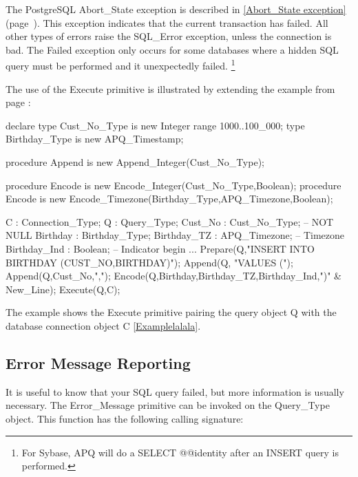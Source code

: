 \documentclass[english,letterpaper]{book}
\newcommand\Ref[1]{\textsection\ref{#1} (page~\pageref{#1})}
\begin{document}
The PostgreSQL Abort\_State
exception is described in \Ref{Abort_State exception}. This exception indicates that
the current transaction has failed. All other types of errors raise
the SQL\_Error exception, unless the connection is bad. The Failed
exception only occurs for some databases where a hidden SQL query
must be performed and it unexpectedly failed.%
\footnote{For Sybase, APQ will do a SELECT @@identity after an INSERT query
is performed.%
}

The use of the Execute primitive is illustrated by extending the example
from page \pageref{Birthday Timezone Example}:

\begin{Example}
declare
   type Cust_No_Type is new Integer range 1000..100_000;
   type Birthday_Type is new APQ_Timestamp;

   procedure Append is new Append_Integer(Cust_No_Type);

   procedure Encode is new
      Encode_Integer(Cust_No_Type,Boolean);
   procedure Encode is new
      Encode_Timezone(Birthday_Type,APQ_Timezone,Boolean);

   C :            Connection_Type;
   Q :            Query_Type;
   Cust_No :      Cust_No_Type;     -- NOT NULL
   Birthday :     Birthday_Type;
   Birthday_TZ :  APQ_Timezone;     -- Timezone
   Birthday_Ind : Boolean;          -- Indicator
begin
   ...
   Prepare(Q,"INSERT INTO BIRTHDAY (CUST_NO,BIRTHDAY)");
   Append(Q, "VALUES (");
   Append(Q,Cust_No,",");
   Encode(Q,Birthday,Birthday_TZ,Birthday_Ind,")" & New_Line);
   Execute(Q,C);
\end{Example}
\label{Examplelalala}

The example shows the Execute primitive pairing the query object Q
with the database connection object C \ref{Examplelalala}.

\subsection{Error Message Reporting\label{Error Message Reporting}}

It is useful to know that your SQL query failed, but more information
is usually necessary. The Error\_Message primitive can be invoked
on the Query\_Type object. This function has the following calling
signature:
\end{document}
